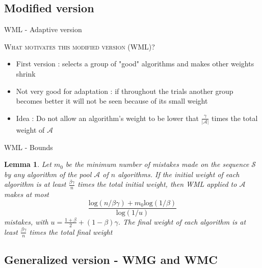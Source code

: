\documentclass{beamer}
\newtheorem{Lm}{Lemma}
\begin{document}
		\subsection{Modified version}

\begin{frame}{WML - Adaptive version}

\textsc{What motivates this modified version (WML)?}  \newline
\begin{itemize}
\item First version :  selects a group of "good" algorithms and makes other weights shrink
\item Not very good for adaptation : if throughout the trials another group becomes better it will not be seen because of its small weight
\item Idea : Do not allow an algorithm's weight to be lower that $\frac{\gamma}{\lvert\mathcal{A}\rvert}$ times the total weight of $\mathcal{A}$
\end{itemize}
\end{frame}

\begin{frame}{WML - Bounds}

\begin{Lm}
Let $m_0$ be the minimum number of mistakes made on the sequence $\mathcal{S}$ by any algorithm of the pool $\mathcal{A}$ of $n$ algorithms. If the initial weight of each algorithm is at least $\frac{\beta\gamma}{n}$ times the total initial weight, then WML applied to $\mathcal{A}$ makes at most
\[\frac{\mathrm{log}(n/\beta\gamma)+m_0\mathrm{log}(1/\beta)}{\mathrm{log}(1/u)}\]
mistakes, with $u = \frac{1+\beta}{2} + (1 - \beta)\gamma$. The final weight of each algorithm is at least $\frac{\beta\gamma}{n}$ times the total final weight
\end{Lm}

\end{frame}
		
		\subsection{Generalized version - WMG and WMC}
\end{document}
